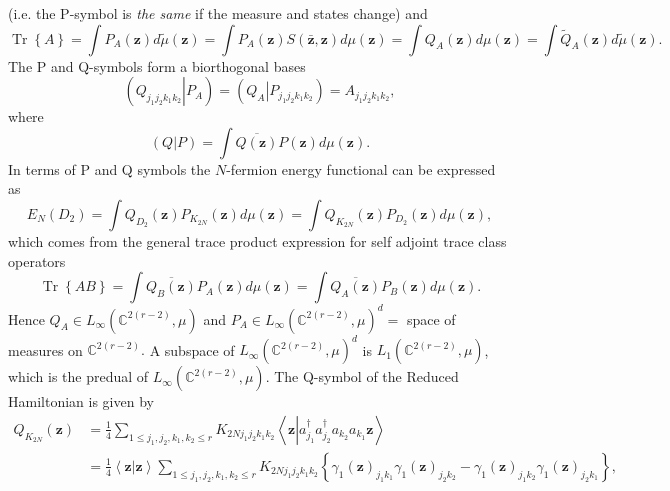 \documentclass[aps,preprint]{revtex4}%
\begin{document}
(i.e. the P-symbol is \emph{the same} if the measure and states change) and
\begin{equation}
\operatorname*{Tr}\left\{  A\right\}  =\int P_{A}\left(  \mathbf{z}\right)
d\tilde{\mu}\left(  \mathbf{z}\right)  =\int P_{A}\left(  \mathbf{z}\right)
S\left(  \mathbf{\bar{z},z}\right)  d\mu\left(  \mathbf{z}\right)  =\int
Q_{A}\left(  \mathbf{z}\right)  d\mu\left(  \mathbf{z}\right)  =\int\tilde
{Q}_{A}\left(  \mathbf{z}\right)  d\tilde{\mu}\left(  \mathbf{z}\right)  .
\end{equation}
The P and Q-symbols form a biorthogonal bases
\begin{equation}
\left(  \left.  Q_{j_{1}j_{2}k_{1}k_{2}}\right\vert P_{A}\right)  =\left(
\left.  Q_{A}\right\vert P_{j_{1}j_{2}k_{1}k_{2}}\right)  =A_{j_{1}j_{2}%
k_{1}k_{2}},
\end{equation}
where
\begin{equation}
\left(  \left.  Q\right\vert P\right)  =\int\overline{Q\left(  \mathbf{z}%
\right)  }P\left(  \mathbf{z}\right)  d\mu\left(  \mathbf{z}\right)  .
\end{equation}
In terms of P and Q symbols the $N$-fermion energy functional can be expressed
as
\begin{equation}
E_{N}\left(  D_{2}\right)  =\int Q_{D_{2}}\left(  \mathbf{z}\right)
P_{K_{2N}}\left(  \mathbf{z}\right)  d\mu\left(  \mathbf{z}\right)  =\int
Q_{K_{2N}}\left(  \mathbf{z}\right)  P_{D_{2}}\left(  \mathbf{z}\right)
d\mu\left(  \mathbf{z}\right)  ,
\end{equation}
which comes from the general trace product expression for self adjoint trace
class operators
\begin{equation}
\operatorname*{Tr}\left\{  AB\right\}  =\int\overline{Q_{B}\left(
\mathbf{z}\right)  }P_{A}\left(  \mathbf{z}\right)  d\mu\left(  \mathbf{z}%
\right)  =\int\overline{Q_{A}\left(  \mathbf{z}\right)  }P_{B}\left(
\mathbf{z}\right)  d\mu\left(  \mathbf{z}\right)  .\nonumber
\end{equation}
Hence $Q_{A}\mathbf{\in}L_{\infty}\left(  \mathbb{C}^{2\left(  r-2\right)
},\mu\right)  $ and $P_{A}\mathbf{\in}L_{\infty}\left(  \mathbb{C}^{2\left(
r-2\right)  },\mu\right)  ^{d}=$ space of measures on $\mathbb{C}^{2\left(
r-2\right)  }.$ A subspace of $L_{\infty}\left(  \mathbb{C}^{2\left(
r-2\right)  },\mu\right)  ^{d}$ is $L_{1}\left(  \mathbb{C}^{2\left(
r-2\right)  },\mu\right)  $, which is the predual of $L_{\infty}\left(
\mathbb{C}^{2\left(  r-2\right)  },\mu\right)  .$ The Q-symbol of the Reduced
Hamiltonian is given by
\begin{align}
Q_{K_{2N}}\left(  \mathbf{z}\right)   &  =\frac{1}{4}\sum_{1\leq j_{1}%
,j_{2},k_{1},k_{2}\leq r}K_{2Nj_{1}j_{2}k_{1}k_{2}}\left\langle \mathbf{z}%
\left\vert a_{j_{1}}^{\dagger}a_{j_{2}}^{\dagger}a_{k_{2}}a_{k_{1}}%
\mathbf{z}\right.  \right\rangle \nonumber\\
&  =\frac{1}{4}\left\langle \mathbf{z}\left\vert \mathbf{z}\right.
\right\rangle \sum_{1\leq j_{1},j_{2},k_{1},k_{2}\leq r}K_{2Nj_{1}j_{2}%
k_{1}k_{2}}\left\{  \gamma_{1}\left(  \mathbf{z}\right)  _{j_{1}k_{1}}%
\gamma_{1}\left(  \mathbf{z}\right)  _{j_{2}k_{2}}-\gamma_{1}\left(
\mathbf{z}\right)  _{j_{1}k_{2}}\gamma_{1}\left(  \mathbf{z}\right)
_{j_{2}k_{1}}\right\}  ,
\end{align}
\end{document}
